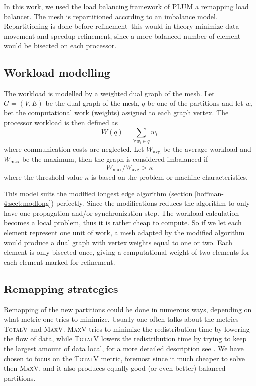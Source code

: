 In this work, we used the load balancing framework of PLUM
\cite{Oliker1998} a remapping load balancer. The mesh is repartitioned
according to an imbalance model. Repartitioning is done before
refinement, this would in theory minimize data movement and speedup
refinement, since a more balanced number of element would be bisected
on each processor.

\subsection{Workload modelling}
The workload is modelled by a weighted dual graph of the mesh. Let
$G=(V,E)$ be the dual graph of the mesh, $q$ be one of the partitions
and let $w_i$ bet the computational work (weights) assigned to each
graph vertex. The processor workload is then defined as
\begin{equation}
  \label{hoffman-4:eq:compwork}
  W(q) = \sum_{\forall w_i \in q} w_i
\end{equation}
where communication costs are neglected. Let $W_\textrm{avg}$ be the average
workload and $W_\textrm{max}$ be the maximum, then the graph is considered
imbalanced if
\begin{equation}
  \label{hoffman-4:eq:imbalancefactor}
  W_\textrm{max} /  W_\textrm{avg}  > \kappa
\end{equation}
where the threshold value $\kappa$ is based on the problem or machine characteristics. 

This model suits the modified longest edge algorithm (section
\ref{hoffman-4:sect:modlong}) perfectly. Since the modifications reduces the
algorithm to only have one propagation and/or synchronization
step. The workload calculation becomes a local problem, thus it is
rather cheap to compute. So if we let each element represent one unit
of work, a mesh adapted by the modified algorithm would produce a dual
graph with vertex weights equal to one or two. Each element is only
bisected once, giving a computational weight of two elements for each
element marked for refinement.

\subsection{Remapping strategies}
\label{hoffman-4:sect:intemap}

Remapping of the new partitions could be done in numerous ways,
depending on what metric one tries to minimize. Usually one often
talks about the metrics \textsc{TotalV} and
\textsc{MaxV}. \textsc{MaxV} tries to minimize the redistribution time
by lowering the flow of data, while \textsc{TotalV} lowers the
redistribution time by trying to keep the largest amount of data
local, for a more detailed description see \cite{Oliker1998}. We have
chosen to focus on the \textsc{TotalV} metric, foremost since it much
cheaper to solve then \textsc{MaxV}, and it also produces equally good (or
even better) balanced partitions.

